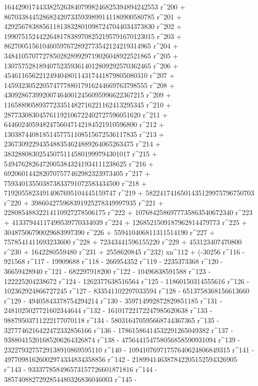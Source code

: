        16442901744338252638407998246825394894242553 r^200 + 
       8670338445286824207335939899141180900580785 r^201 + 
       4292567838856118138328010987247044034373830 r^202 + 
       1990751524422648178389708252195791670123015 r^203 + 
       862700515610460597672892773542124219314965 r^204 + 
       348410570772785028289929719026048922521865 r^205 + 
       130757528189407523593614012809292570362465 r^206 + 
       45461165622124940480114317441879805080310 r^207 + 
       14593230522057477788017916244669763798555 r^208 + 
       4309286739920074640012456095996622367215 r^209 + 
       1165889058937723351482716221162413295345 r^210 + 
       287733083045761192106722402727596051620 r^211 + 
       64460240594824756047142184521910596800 r^212 + 
       13038744081851457751108515672536117835 r^213 + 
       2367309229435488354624889264065263475 r^214 + 
       383288083025450751145801999794301017 r^215 + 
       54947628264720053843241934111238625 r^216 + 
       6920601442820707577462982323973405 r^217 + 
       759340135503873833791072583434500 r^218 + 
       71920558234914067695104445159747 r^219 + 
       5822417416501435129975796750703 r^220 + 
       398604275968391925278349997935 r^221 + 
       22808548832214110927278506175 r^222 + 
       1076842586977735863540672340 r^223 + 
       41337944117499539770334039 r^224 + 
       1268521509187962814479773 r^225 + 
       30487506790029683997390 r^226 + 559410406811311514190 r^227 + 
       7578541411693233600 r^228 + 72343441596155220 r^229 + 
       453123407470800 r^230 + 1642280559480 r^231 + 
       2558620845 r^232) xn^112 + (-30256 r^116 - 921568 r^117 - 
       19909688 r^118 - 266954352 r^119 - 2235373368 r^120 - 
       36659428940 r^121 - 682297918200 r^122 - 
       10496838591588 r^123 - 122225204238672 r^124 - 
       1262377638516564 r^125 - 11860150314555616 r^126 - 
       102362924866727245 r^127 - 833541102297033594 r^128 - 
       6513758368156613660 r^129 - 49405843378754294214 r^130 - 
       359714992872829851185 r^131 - 2481025027721602344644 r^132 - 
       16101722172247985620638 r^133 - 
       98879503711222177070118 r^134 - 
       580316470595668744367365 r^135 - 
       3277746216422472332856166 r^136 - 
       17861586414532291265049382 r^137 - 
       93880415201685206264326874 r^138 - 
       475644154758056858590931094 r^139 - 
       2322793275729138910869595110 r^140 - 
       10941076971757640624806849315 r^141 - 
       49770981626002974334834358856 r^142 - 
       218994146387842205152594326905 r^143 - 
       933377858496573157726601871816 r^144 - 
       3857408827292854480326836046003 r^145 - 
